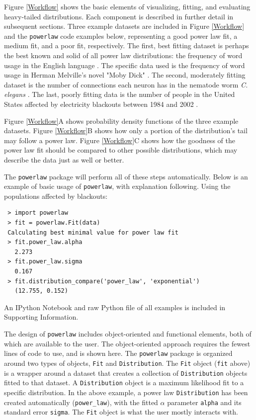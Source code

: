 \documentclass[10pt]{article}
\begin{document}
Figure \ref{Workflow} shows the basic elements of visualizing, fitting, and evaluating heavy-tailed distributions. Each component is described in further detail in subsequent sections. Three example datasets are included in Figure \ref{Workflow} and the \verb$powerlaw$ code examples below, representing a good power law fit, a medium fit, and a poor fit, respectively. The first, best fitting dataset is perhaps the best known and solid of all power law distributions: the frequency of word usage in the English language \cite{Zipf1935}. The specific data used is the frequency of word usage in Herman Melville's novel "Moby Dick" \cite{Newman2005}. The second, moderately fitting dataset is the number of connections each neuron has in the nematode worm \textit{C. elegans} \cite{Towlson2013,Varshney2011}. The last, poorly fitting data is the number of people in the United States affected by electricity blackouts between 1984 and 2002 \cite{Newman2005}. 
 
 Figure \ref{Workflow}A shows probability density functions of the three example datasets. Figure \ref{Workflow}B shows how only a portion of the distribution's tail may follow a power law. Figure \ref{Workflow}C shows how the goodness of the power law fit should be compared to other possible distributions, which may describe the data just as well or better.
 
 The \verb$powerlaw$ package will perform all of these steps automatically. Below is an example of basic usage of \verb$powerlaw$, with explanation following. Using the populations affected by blackouts:
 
 \begin{verbatim}
 > import powerlaw
 > fit = powerlaw.Fit(data)
 Calculating best minimal value for power law fit
 > fit.power_law.alpha
   2.273
 > fit.power_law.sigma
   0.167
 > fit.distribution_compare('power_law', 'exponential')
   (12.755, 0.152)
 \end{verbatim}
 
 An IPython Notebook and raw Python file of all examples is included in Supporting Information.
 
 The design of \verb$powerlaw$ includes object-oriented and functional elements, both of which are available to the user. The object-oriented approach requires the fewest lines of code to use, and is shown here. The \verb$powerlaw$ package is organized around two types of objects, \verb$Fit$ and \verb$Distribution$. The \verb$Fit$ object (\verb$fit$ above) is a wrapper around a dataset that creates a collection of \verb$Distribution$ objects fitted to that dataset. A \verb$Distribution$ object is a maximum likelihood fit to a specific distribution. In the above example, a power law \verb$Distribution$ has been created automatically (\verb$power_law$), with the fitted $\alpha$ parameter \verb$alpha$ and its standard error \verb$sigma$. The \verb$Fit$ object is what the user mostly interacts with.
 
\end{document}

